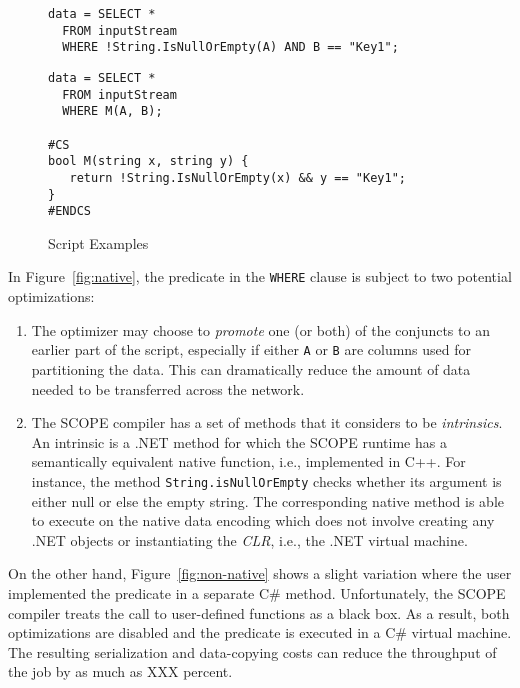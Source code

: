 \begin{figure}[ht]
 \begin{minipage}[b]{\linewidth}
  
   \begin{verbatim}
data = SELECT *
  FROM inputStream
  WHERE !String.IsNullOrEmpty(A) AND B == "Key1";
\end{verbatim}

    \label{fig:native}
  \end{minipage}
  \begin{minipage}[b]{\linewidth}
   \begin{verbatim}
data = SELECT *
  FROM inputStream
  WHERE M(A, B);

#CS
bool M(string x, string y) {
   return !String.IsNullOrEmpty(x) && y == "Key1";
}
#ENDCS
    \end{verbatim}

    \label{fig:non-native}
  \end{minipage}


\caption{Script Examples}
\label{fig:example}
\end{figure}

In Figure~\ref{fig:native}, the predicate in the {\tt WHERE} clause is subject to two potential optimizations:
\begin{enumerate}
\item The optimizer may choose to {\em promote} one (or both) of the conjuncts to an earlier part of the script, especially if either {\tt A} or {\tt B} are columns used for partitioning the data.
This can dramatically reduce the amount of data needed to be transferred across the network.
\item The SCOPE compiler has a set of methods that it considers to be {\em intrinsics}.
An intrinsic is a .NET method for which the SCOPE runtime has a semantically equivalent native function, i.e., implemented in C++.
For instance, the method {\tt String.isNullOrEmpty} checks whether its argument is either null or else the empty string.
The corresponding native method is able to execute on the native data encoding which does not involve creating any .NET objects or instantiating the {\em CLR}, i.e., the .NET virtual machine.
\end{enumerate}

On the other hand, Figure~\ref{fig:non-native} shows a slight variation where the user implemented the predicate in a separate C\# method. Unfortunately, the SCOPE compiler treats the call to user-defined functions as a black box. As a result, both optimizations are disabled and the predicate is executed in a C\# virtual machine. The resulting serialization and data-copying costs can reduce the throughput of the job by as much as XXX percent. 


